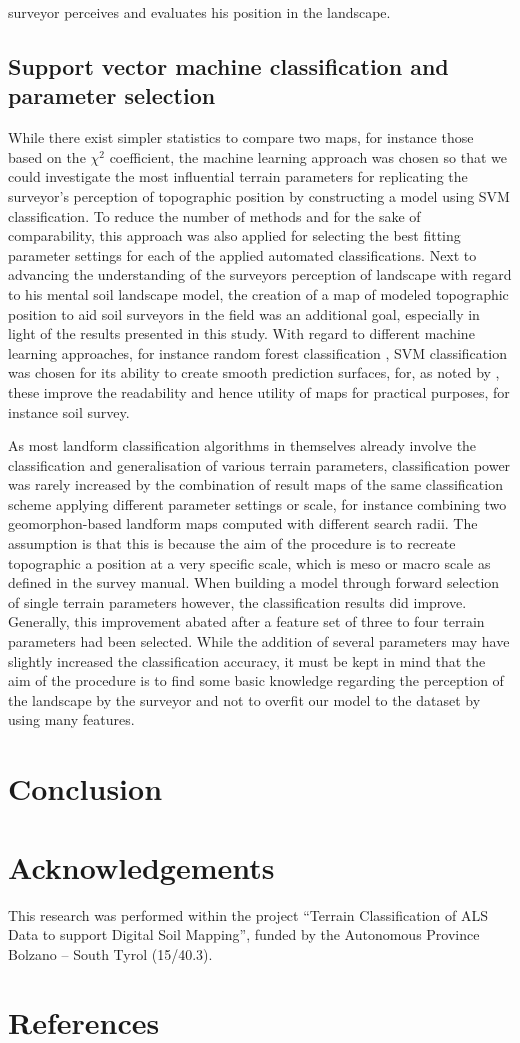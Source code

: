 \documentclass[preprint,12pt,authoryear]{elsarticle}
\begin{document}
surveyor perceives and evaluates his position in the landscape. 

\subsection{Support vector machine classification and parameter selection}
While there exist simpler statistics to compare two maps, for instance those based on the $\chi^2$ coefficient, the machine learning approach was chosen so that we could investigate the most influential terrain parameters for replicating the surveyor's perception of topographic position by constructing a model using  SVM classification. To reduce the number of methods and for the sake of comparability, this approach was also applied for selecting the best fitting parameter settings for each of the applied automated classifications. Next to advancing the understanding of the surveyors perception of landscape with regard to his mental soil landscape model, the creation of a map of modeled topographic position to aid soil surveyors in the field was an additional goal, especially in light of the results presented in this study. With regard to different machine learning approaches, for instance random forest classification \citep{Breiman2001}, SVM classification was chosen for its ability to create smooth prediction surfaces, for, as noted by \cite{Steger2016}, these improve the readability and hence utility of maps for practical purposes, for instance soil survey.

As most landform classification algorithms in themselves already involve the classification and generalisation of various terrain parameters, classification power was rarely increased by the combination of result maps of the same classification scheme applying different parameter settings or scale, for instance combining two geomorphon-based landform maps computed with different search radii. The assumption is that this is because the aim of the procedure is to recreate topographic a position at a very specific scale, which is meso or macro scale as defined in the survey manual. When building a model through forward selection of single terrain parameters however, the classification results did improve. Generally, this improvement abated after a feature set of  three to four terrain parameters had been selected. While the addition of several parameters may have slightly increased the classification accuracy, it must be kept in mind that the aim of the procedure is to find some basic knowledge regarding the perception of the landscape by the surveyor and not to overfit our model to the dataset by using many features.
\section{Conclusion}
\section*{Acknowledgements} This research was performed within the project ``Terrain Classification of ALS Data to support Digital Soil Mapping'', funded by the Autonomous Province Bolzano -- South Tyrol (15/40.3).
\section*{References}

\end{document}
